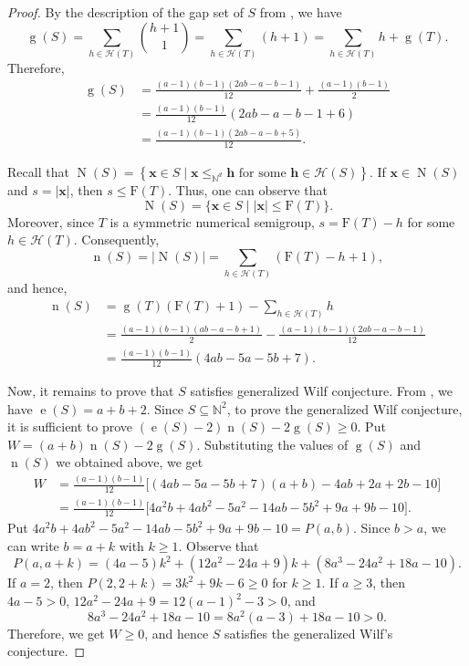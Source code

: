 \documentclass[12pt]{amsart}
\newcommand{\numberset}{\mathbb}
\newcommand{\N}{\numberset{N}}
\theoremstyle{plain}
\theoremstyle{theorem}
\theoremstyle{remark}
\begin{document}
\begin{proof}
	By the description of the gap set of $S$ from \cite[Remark~4.2]{Cisto-Navarra}, we have
	\[
	\operatorname{g}(S)
	=
	\sum_{h\in \mathcal{H}(T)}
	\binom{h+1}{1}	=
	\sum_{h\in \mathcal{H}(T)}(h+1)
	=
	\sum_{h\in \mathcal{H}(T)}h+\operatorname{g}(T).
	\]
	Therefore,
	\begin{align*}
		\operatorname{g}(S)
		&=
		\frac{(a-1)(b-1)(2ab-a-b-1)}{12}
		+
		\frac{(a-1)(b-1)}{2}\\
		&=
		\frac{(a-1)(b-1)}{12}
		\left(2ab-a-b-1+6\right)\\
		&=
		\frac{(a-1)(b-1)(2ab-a-b+5)}{12}.
	\end{align*}
	
	Recall that $\operatorname{N}(S)
	=
	\left\{
	\mathbf{x}\in S \mid \mathbf{x} \leq_{\mathbb{N}^d}  \mathbf{h}
	\text{ for some }\mathbf{h}\in \mathcal{H}(S)
	\right\}.$ If $\mathbf{x}\in \operatorname{N}(S)$ and $s=|\mathbf{x}|$, then $s\leq \mathrm{F}(T)$. Thus, one can observe that
	\[\operatorname{N}(S) = \{\mathbf{x} \in S \mid |\mathbf{x}| \leq \mathrm{F}(T)\}.\] Moreover, since $T$ is a symmetric numerical semigroup, $s=\mathrm{F}(T)-h $ for some $h\in \mathcal{H}(T)$.  Consequently,
	\[ \operatorname{n}(S)=|\operatorname{N}(S)| = \sum_{h\in \mathcal{H}(T)}(\mathrm{F}(T)-h+1), \]
	and hence,
	\begin{align*}
		\operatorname{n}(S)
		&=
		\operatorname{g}(T)(\mathrm{F}(T)+1)
		-
		\sum_{h\in \mathcal{H}(T)}h\\
		&=
		\frac{(a-1)(b-1)(ab-a-b+1)}{2} -
		\frac{(a-1)(b-1)(2ab-a-b-1)}{12}\\
			&=
		\frac{(a-1)(b-1)}{12}
		\left(4ab-5a-5b+7\right).
	\end{align*}

	Now, it remains to prove that $S$ satisfies generalized Wilf conjecture. From \cite[Corollary~4.7]{Cisto-Navarra}, we have $\operatorname{e}(S)=a+b+2$. Since $S\subseteq\N^2$, to prove the generalized Wilf conjecture, it is sufficient to prove $(\operatorname{e}(S)-2)\operatorname{n}(S)-2 \operatorname{g}(S)\geq 0$. Put $W=(a+b)\operatorname{n}(S)-2 \operatorname{g}(S)$.
	Substituting the values of $\operatorname{g}(S)$ and $\operatorname{n}(S)$ we obtained above, we get
	\begin{align*}
		W
		&=
		\frac{(a-1)(b-1)}{12}
		\Big[
		(4ab-5a-5b+7)(a+b)-4ab+2a+2b-10 \Big]\\
		&=
		\frac{(a-1)(b-1)}{12}
		\Big[4a^2b+4ab^2-5a^2-14ab-5b^2+9a+9b-10\Big].
	\end{align*}
Put $4a^2b+4ab^2-5a^2-14ab-5b^2+9a+9b-10 = P(a,b)$. Since $b > a$, we can write $b = a+k$ with $k \geq 1$. Observe that
\[ P(a,a+k) = (4a - 5)k^2 + (12a^2 - 24a + 9)k + (8a^3 - 24a^2 + 18a - 10).\]
If $a = 2$, then $P(2,2+k) = 3k^2 +9k - 6 \geq 0$ for $k \geq 1$. If $a \geq 3$, then $4a - 5 > 0$,
$12a^2 - 24a + 9 = 12(a-1)^2 - 3 > 0$,
and
\[8a^3 - 24a^2 + 18a - 10 = 8a^2(a - 3) + 18a - 10 > 0.\]
Therefore, we get $W \geq 0$, and hence $S$ satisfies the generalized Wilf's conjecture.
\end{proof}
\end{document}
